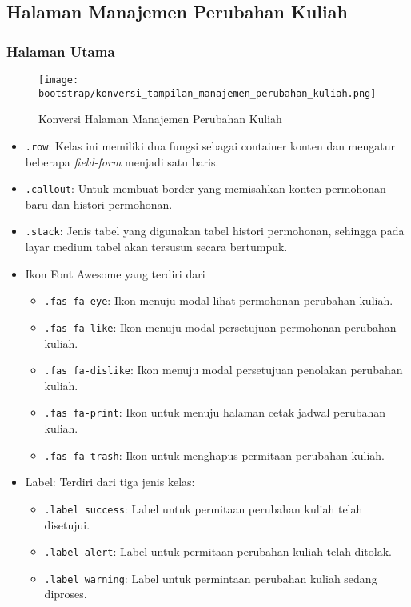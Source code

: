 \subsection{Halaman Manajemen Perubahan Kuliah}
\subsubsection{Halaman Utama}
\begin{figure} [H]
	\centering  
	\texttt{[image: bootstrap/konversi\_tampilan\_manajemen\_perubahan\_kuliah.png]}
	\caption{Konversi Halaman Manajemen Perubahan Kuliah}
\end{figure}
\begin{itemize}
	\item \texttt{.row}: Kelas ini memiliki dua fungsi sebagai container konten dan mengatur beberapa \textit{field-form} menjadi satu baris. 
	\item \texttt{.callout}: Untuk membuat border yang memisahkan konten permohonan baru dan histori permohonan.
	\item \texttt{.stack}: Jenis tabel yang digunakan tabel histori permohonan, sehingga pada layar medium tabel akan tersusun secara bertumpuk.
	\item Ikon Font Awesome yang terdiri dari 
	\begin{itemize}
		\item \texttt{.fas fa-eye}: Ikon menuju modal lihat permohonan perubahan kuliah.
		\item \texttt{.fas fa-like}: Ikon menuju modal persetujuan permohonan perubahan kuliah.
		\item \texttt{.fas fa-dislike}: Ikon menuju modal persetujuan penolakan perubahan kuliah.
		\item \texttt{.fas fa-print}: Ikon untuk menuju halaman cetak jadwal perubahan kuliah.
		\item \texttt{.fas fa-trash}: Ikon untuk menghapus permitaan perubahan kuliah.
	\end{itemize}
	\item Label: Terdiri dari tiga jenis kelas:
	\begin{itemize}
		\item \texttt{.label success}: Label untuk permitaan perubahan kuliah telah disetujui.
		\item \texttt{.label alert}:  Label untuk permitaan perubahan kuliah telah ditolak.
		\item \texttt{.label warning}: Label untuk permintaan perubahan kuliah sedang diproses.
	\end{itemize}
	
\end{itemize}
